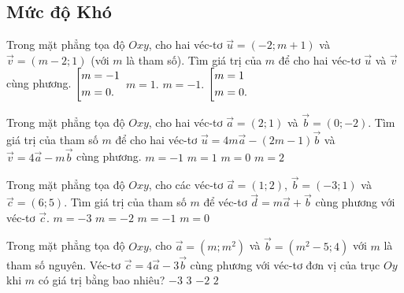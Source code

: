 \subsection*{Mức độ Khó}
\begin{ex}%
	Trong mặt phẳng tọa độ $Oxy$, cho hai véc-tơ $\vec{u} =(-2;m+1)$ và $\vec{v} =(m-2;1)$ (với $m$ là tham số). Tìm giá trị của $m$ để cho hai véc-tơ $\vec{u}$ và $\vec{v}$ cùng phương.
	\def\dotEX{}
	\choice
	{$\left[\begin{aligned}&m=-1 \\ &m=0.\end{aligned}\right.$}
	{$m=1.$}
	{$m=-1.$}
	{\True $\left[\begin{aligned}&m=1 \\ &m=0.\end{aligned}\right.$} 
\end{ex}

\begin{ex}%
	Trong mặt phẳng tọa độ $Oxy$, cho hai véc-tơ $\vec{a} =(2;1)$ và $\vec{b} =(0;-2)$. Tìm giá trị của tham số $m$ để cho hai véc-tơ $\vec{u} =4m\vec{a} -(2m-1)\vec{b}$ và $\vec{v} =4\vec{a} -m\vec{b}$ cùng phương.
	\choice
	{$m=-1$}
	{\True $m=1$}
	{$m=0$}
	{$m=2$} 
\end{ex}

\begin{ex}%
	Trong mặt phẳng tọa độ $Oxy$, cho các véc-tơ $\vec{a}=(1;2)$, $\vec{b}=(-3;1)$ và $\vec{c}=(6;5)$. Tìm giá trị của tham số $m$ để véc-tơ $\vec{d}=m\vec{a}+\vec{b}$ cùng phương với véc-tơ $\vec{c}$.
	\choice
	{\True $m=-3$}
	{$m=-2$}
	{$m=-1$}
	{$m=0$}
\end{ex}

\begin{ex}%
	Trong mặt phẳng tọa độ $Oxy$, cho $\vec{a}=(m;m^2)$ và $\vec{b}=(m^2-5;4)$ với $m$ là tham số nguyên. Véc-tơ $\vec{c}=4\vec{a}-3\vec{b}$ cùng phương với véc-tơ đơn vị của trục $Oy$ khi $m$ có giá trị bằng bao nhiêu? 
	\choice
	{$-3$}
	{\True $3$}
	{$-2$}
	{$2$}
\end{ex}

